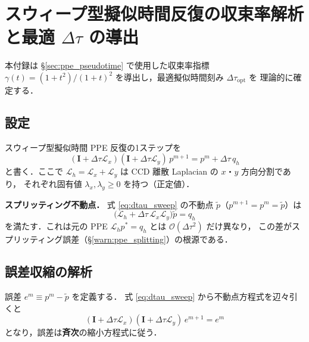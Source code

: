 %
%

\section{スウィープ型擬似時間反復の収束率解析と最適 \texorpdfstring{$\Delta\tau$}{Δτ} の導出}
\label{sec:dtau_derive}

本付録は §\ref{sec:ppe_pseudotime} で使用した収束率指標
$\gamma(t) = (1+t^2)/(1+t)^2$ を導出し，最適擬似時間刻み $\Delta\tau_{\mathrm{opt}}$ を
理論的に確定する．

\subsection*{設定}

スウィープ型擬似時間 PPE 反復の1ステップを
\begin{equation}
  (\mathbf{I} + \Delta\tau \mathcal{L}_x)(\mathbf{I} + \Delta\tau \mathcal{L}_y)\,
  p^{m+1} = p^m + \Delta\tau\,q_h
  \label{eq:dtau_sweep}
\end{equation}
と書く．ここで $\mathcal{L}_h = \mathcal{L}_x + \mathcal{L}_y$ は
CCD 離散 Laplacian の $x$・$y$ 方向分割であり，
それぞれ固有値 $\lambda_x,\lambda_y \ge 0$ を持つ（正定値）．

\textbf{スプリッティング不動点．}
式 \eqref{eq:dtau_sweep} の不動点 $\tilde{p}$（$p^{m+1}=p^m=\tilde{p}$）は
\[
  \bigl(\mathcal{L}_h + \Delta\tau\,\mathcal{L}_x\mathcal{L}_y\bigr)\tilde{p} = q_h
\]
を満たす．これは元の PPE $\mathcal{L}_h p^* = q_h$ とは $\mathcal{O}(\Delta\tau^2)$ だけ異なり，
この差がスプリッティング誤差（§\ref{warn:ppe_splitting}）の根源である．

\subsection*{誤差収縮の解析}

誤差 $e^m \equiv p^m - \tilde{p}$ を定義する．
式 \eqref{eq:dtau_sweep} から不動点方程式を辺々引くと
\[
  (\mathbf{I}+\Delta\tau\mathcal{L}_x)(\mathbf{I}+\Delta\tau\mathcal{L}_y)\,e^{m+1} = e^m
\]
となり，誤差は\textbf{斉次}の縮小方程式に従う．

